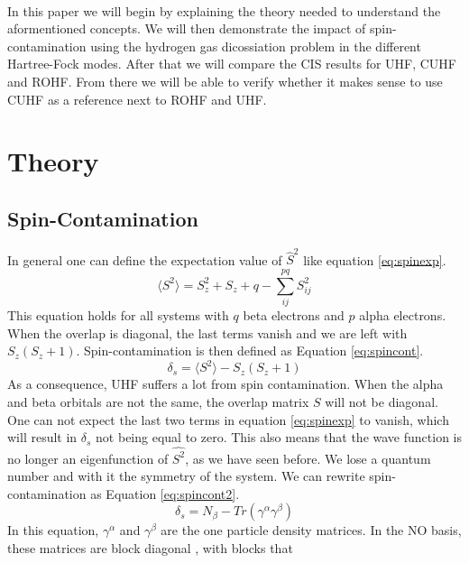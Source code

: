 \documentclass[twoside,twocolumn,9pt]{article}
\begin{document}
\paragraph*{}
In this paper we will begin by explaining the theory needed to understand the aformentioned concepts. We will then demonstrate the impact of spin-contamination using the hydrogen gas
dicossiation problem in the different Hartree-Fock modes. After that we will compare the CIS results for UHF, CUHF and ROHF. From there we will be able to verify whether it makes
sense to use CUHF as a reference next to ROHF and UHF.


\section{Theory}

\subsection{Spin-Contamination}
In general one can define the expectation value of $\hat{S}^2$ like equation \eqref{eq:spinexp}\cite{Andrews1991}.
\begin{equation}\label{eq:spinexp}
  \langle S^2 \rangle = S_z^2 + S_z + q - \sum_{ij}^{pq} S_{ij}^2
\end{equation}
This equation holds for all systems with $q$ beta electrons and $p$ alpha electrons. When the overlap is diagonal, the last terms vanish and we are left with $S_z(S_z + 1)$.
Spin-contamination is then defined as Equation \eqref{eq:spincont}.
\begin{equation}\label{eq:spincont}
  \delta_s = \langle S^2 \rangle - S_z(S_z + 1)
\end{equation}
As a consequence, UHF suffers a lot from spin contamination. When the alpha and beta orbitals are not the same, the overlap matrix $S$ will not be diagonal. One can not expect the
last two terms in equation \eqref{eq:spinexp} to vanish, which will result in $\delta_s$ not being equal to zero. This also means that the wave function is no longer an eigenfunction
of $\hat{S^2}$, as we have seen before. We lose a quantum number and with it the symmetry of the system. We can rewrite spin-contamination as Equation \eqref{eq:spincont2}\cite{Savin2010}.
\begin{equation}\label{eq:spincont2}
  \delta_s = N_\beta - Tr(\gamma^\alpha\gamma^\beta)
\end{equation}
In this equation, $\gamma^{\alpha}$ and $\gamma^\beta$ are the one particle density matrices. In the NO basis, these matrices are block diagonal \cite{Scuseria2010}, with blocks that
\end{document}
